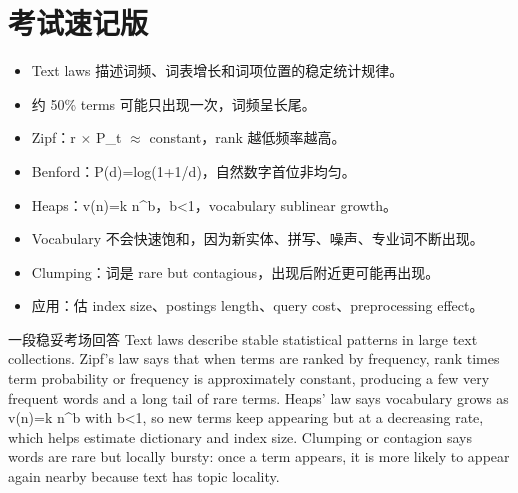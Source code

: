 \documentclass[11pt,a4paper]{ctexart}
\begin{document}
\section{考试速记版}
\begin{itemize}
\item Text laws 描述词频、词表增长和词项位置的稳定统计规律。
\item 约 50\% terms 可能只出现一次，词频呈长尾。
\item Zipf：r \(\times\) P\_t \(\approx\) constant，rank 越低频率越高。
\item Benford：P(d)=log(1+1/d)，自然数字首位非均匀。
\item Heaps：v(n)=k n\textasciicircum{}b，b<1，vocabulary sublinear growth。
\item Vocabulary 不会快速饱和，因为新实体、拼写、噪声、专业词不断出现。
\item Clumping：词是 rare but contagious，出现后附近更可能再出现。
\item 应用：估 index size、postings length、query cost、preprocessing effect。
\end{itemize}
\begin{callout}{一段稳妥考场回答}
Text laws describe stable statistical patterns in large text collections. Zipf's law says that when terms are ranked by frequency, rank times term probability or frequency is approximately constant, producing a few very frequent words and a long tail of rare terms. Heaps' law says vocabulary grows as v(n)=k n\textasciicircum{}b with b<1, so new terms keep appearing but at a decreasing rate, which helps estimate dictionary and index size. Clumping or contagion says words are rare but locally bursty: once a term appears, it is more likely to appear again nearby because text has topic locality.
\end{callout}
\end{document}
